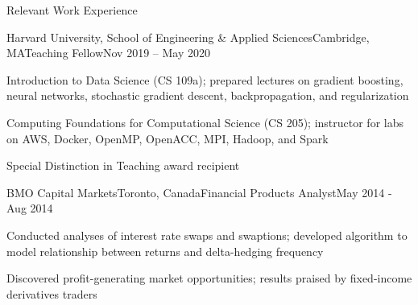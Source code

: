 \documentclass{resume} %
\begin{document}
\begin{rSection}{Relevant Work Experience}

\begin{rSubsection}{Harvard University, School of Engineering \& Applied Sciences}{Cambridge, MA}{Teaching Fellow}{Nov 2019 -- May 2020}

\item Introduction to Data Science (CS 109a); prepared lectures on gradient boosting, neural networks, stochastic gradient descent, backpropagation, and regularization
\item Computing Foundations for Computational Science (CS 205); instructor for labs on AWS, Docker, OpenMP, OpenACC, MPI, Hadoop, and Spark
\item Special Distinction in Teaching award recipient
    
\end{rSubsection}

\begin{rSubsection}{BMO Capital Markets}{Toronto, Canada}{Financial Products Analyst}{May 2014 - Aug 2014}

\item Conducted analyses of interest rate swaps and swaptions; developed algorithm to model relationship between returns and delta-hedging frequency
\item Discovered profit-generating market opportunities; results praised by fixed-income derivatives traders
    
\end{rSubsection}


\end{rSection}

\end{document}
